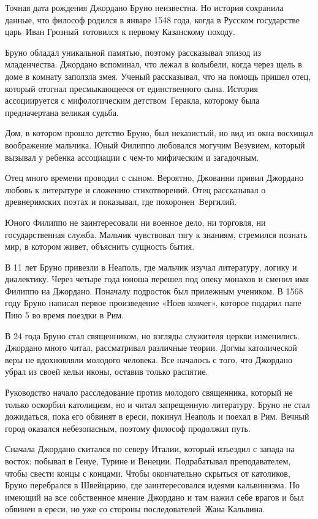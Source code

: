 \documentclass[a4paper, 14pt]{extreport}
\begin{document}
Точная дата рождения Джордано Бруно неизвестна. Но история сохранила
данные, что философ родился в январе 1548 года, когда в Русском
государстве царь~Иван Грозный~готовился к первому Казанскому походу.

Бруно обладал уникальной памятью, поэтому рассказывал эпизод из
младенчества. Джордано вспоминал, что лежал в колыбели, когда через щель
в доме в комнату заползла змея. Ученый рассказывал, что на помощь пришел
отец, который отогнал пресмыкающееся от единственного сына. История
ассоциируется с мифологическим детством~Геракла, которому была
предначертана великая судьба.

Дом, в котором прошло детство Бруно, был неказистый, но вид из окна
восхищал воображение мальчика. Юный Филиппо любовался могучим Везувием,
который вызывал у ребенка ассоциации с чем-то мифическим и загадочным.

Отец много времени проводил с сыном. Вероятно, Джованни привил Джордано
любовь к литературе и сложению стихотворений. Отец рассказывал о
древнеримских поэтах и показывал, где похоронен~Вергилий.

Юного Филиппо не заинтересовали ни военное дело, ни торговля, ни
государственная служба. Мальчик чувствовал тягу к знаниям, стремился
познать мир, в котором живет, объяснить сущность бытия.

В 11 лет Бруно привезли в Неаполь, где мальчик изучал литературу, логику
и диалектику. Через четыре года юноша перешел под опеку монахов и сменил
имя Филиппо на Джордано. Поначалу подросток был прилежным учеником. В
1568 году Бруно написал первое произведение «Ноев ковчег», которое
подарил папе Пию 5 во время поездки в Рим.

В 24 года Бруно стал священником, но взгляды служителя церкви
изменились. Джордано много читал, рассматривал различные теории. Догмы
католической веры не вдохновляли молодого человека. Все началось с того,
что Джордано убрал из своей кельи иконы, оставив только распятие.

Руководство начало расследование против молодого священника, который не
только оскорбил католицизм, но и читал запрещенную литературу. Бруно не
стал дожидаться, пока его обвинят в ереси, покинул Неаполь и поехал в
Рим. Вечный город оказался небезопасным, поэтому философ продолжил путь.

Сначала Джордано скитался по северу Италии, который изъездил с запада на
восток: побывал в Генуе, Турине и Венеции. Подрабатывал преподавателем,
чтобы свести концы с концами. Чтобы окончательно скрыться от католиков,
Бруно перебрался в Швейцарию, где заинтересовался идеями кальвинизма. Но
имеющий на все собственное мнение Джордано и там нажил себе врагов и был
обвинен в ереси, но уже со стороны последователей~Жана Кальвина.
\end{document}
